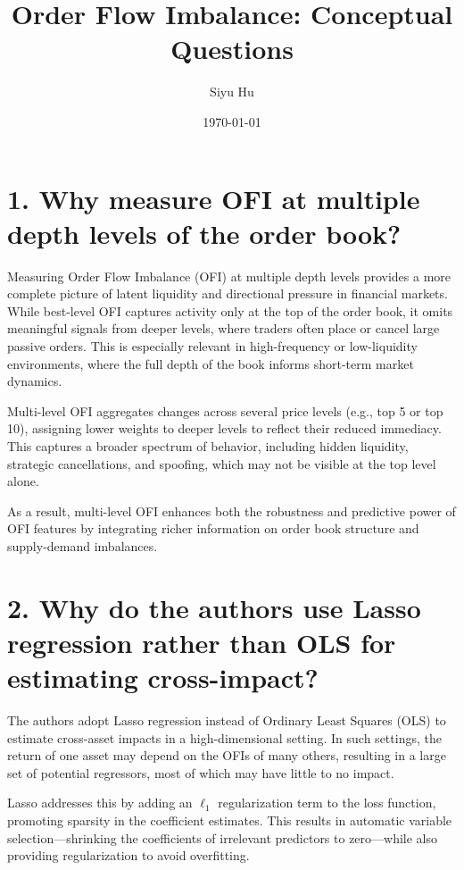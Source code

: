 \documentclass{article}
\title{Order Flow Imbalance: Conceptual Questions}
\author{Siyu Hu}
\date{\today}
\begin{document}
\maketitle

\section*{1. Why measure OFI at multiple depth levels of the order book?}

Measuring Order Flow Imbalance (OFI) at multiple depth levels provides a more complete picture of latent liquidity and directional pressure in financial markets. While best-level OFI captures activity only at the top of the order book, it omits meaningful signals from deeper levels, where traders often place or cancel large passive orders. This is especially relevant in high-frequency or low-liquidity environments, where the full depth of the book informs short-term market dynamics\cite{Cont2013}.

Multi-level OFI aggregates changes across several price levels (e.g., top 5 or top 10), assigning lower weights to deeper levels to reflect their reduced immediacy. This captures a broader spectrum of behavior, including hidden liquidity, strategic cancellations, and spoofing, which may not be visible at the top level alone.

As a result, multi-level OFI enhances both the robustness and predictive power of OFI features by integrating richer information on order book structure and supply-demand imbalances.

\section*{2. Why do the authors use Lasso regression rather than OLS for estimating cross-impact?}

The authors adopt Lasso regression instead of Ordinary Least Squares (OLS) to estimate cross-asset impacts in a high-dimensional setting\cite{Cont2013}. In such settings, the return of one asset may depend on the OFIs of many others, resulting in a large set of potential regressors, most of which may have little to no impact.

Lasso addresses this by adding an $\ell_1$ regularization term to the loss function, promoting sparsity in the coefficient estimates. This results in automatic variable selection—shrinking the coefficients of irrelevant predictors to zero—while also providing regularization to avoid overfitting.
\end{document}
